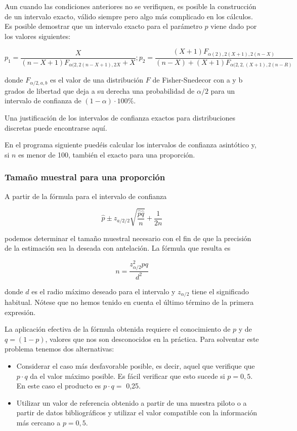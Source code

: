 \documentclass[
]{article}
\providecommand{\tightlist}{%
  \setlength{\itemsep}{0pt}\setlength{\parskip}{0pt}}
\begin{document}
Aun cuando las condiciones anteriores no se verifiquen, es posible la construcción de un intervalo exacto, válido siempre pero algo más complicado en los cálculos. Es posible demostrar que un intervalo exacto para el parámetro \(p\) viene dado por los valores siguientes:

\[
p_{1}=\frac{X}{(n-X+1) F_{\alpha(2,2(n-X+1), 2 X}+X} ; p_{2}=\frac{(X+1) F_{\alpha(2), 2(X+1), 2(n-X)}}{(n-X)+(X+1) F_{\alpha(2,2,(X+1), 2(n-R)}}
\]

donde \(F_{\alpha / 2, a, b}\) es el valor de una distribución \(F\) de Fisher-Snedecor con a y b grados de libertad que deja a su derecha una probabilidad de \(\alpha / 2\) para un intervalo de confianza de \((1-\alpha) \cdot 100 \%\).

Una justificación de los intervalos de confianza exactos para distribuciones discretas puede encontrarse aquí.

En el programa siguiente puedéis calcular los intervalos de confianza asintótico y, si \(n\) es menor de 100, también el exacto para una proporción.

\subsubsection{Tamaño muestral para una proporción}\label{tamauxf1o-muestral-para-una-proporciuxf3n}

A partir de la fórmula para el intervalo de confianza

\[
\hat{p} \pm z_{a / 2 / 2} \sqrt{\frac{\hat{p} \hat{q}}{n}}+\frac{1}{2 n}
\]

podemos determinar el tamaño muestral necesario con el fin de que la precisión de la estimación sea la deseada con antelación. La fórmula que resulta es

\[
n=\frac{z_{\alpha / 2}^{2} p q}{d^{2}}
\]

donde \(d\) es el radio máximo deseado para el intervalo y \(z_{\alpha / 2}\) tiene el significado habitual. Nótese que no hemos tenido en cuenta el último término de la primera expresión.

La aplicación efectiva de la fórmula obtenida requiere el conocimiento de \(p\) y de \(q=(1-p)\), valores que nos son desconocidos en la práctica. Para solventar este problema tenemos dos alternativas:

\begin{itemize}
\tightlist
\item
  Considerar el caso más desfavorable posible, es decir, aquel que verifique que \(p \cdot q\) da el valor máximo posible. Es fácil verificar que esto sucede si \(p=0,5\). En este caso el producto es \(p \cdot q=\) 0,25.
\item
  Utilizar un valor de referencia obtenido a partir de una muestra piloto o a partir de datos bibliográficos y utilizar el valor compatible con la información más cercano a \(p=0,5\).
\end{itemize}
\end{document}
